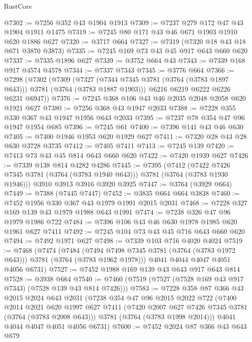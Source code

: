 \begin{lexlean}{RustCore}
\begin{coremodule}
@7302 := @7256 @352 @43 @1904 @1913
@7309 := @7237 @279 @172 @47 @43 @1904 @1911 @1475
@7319 := @7245 @80 @171 @43 @46 @671 @1903 @1910 @620 @1886 @627
@7320 := @3717 @664
@7327 := @7319 (@7320 @18 @43 @18 @671 @3870 @3873)
@7335 := @7245 @169 @73 @43 @45 @917 @643 @660 @620
@7337 := @7335 @1896 @627
@7339 := @3752 @664 @43
@7343 := @7339 @168 @917 @4574 @4578
@7344 := @7337 @7343
@7345 := @3776 @664
@7366 := @7298
    (@7302
      (@7309
        (@7327 (@7344 @7345 @3781 (@3764 (@3783 @1897 @643))) @3781 (@3764 (@3783 @1887 @1903)))
        @6216
        @6219
        @6222
        @6226
        @6231
        @6947))
@7376 := @7245 @368 @106 @43 @46 @2035 @2048 @2058 @620 @1921 @627
@7380 := @7256 @368 @43 @1947 @2033
@7388 := @7228 @355 @330 @367 @43 @1947 @1956 @643 @2033
@7395 := @7237 @78 @354 @47 @96 @1947 @1954 @685
@7396 := @7245 @61
@7400 := @7396 @141 @43 @46 @630
@7405 := @7400 @1946 @1953 @620 @1929 @627
@7411 := @7320 @28 @43 @28 @630 @3728 @3735
@7412 := @7405 @7411
@7413 := @7245 @139
@7420 := @7413 @73 @43 @45 @814 @643 @660 @620
@7422 := @7420 @1939 @627
@7426 := @7339 @138 @814 @4282 @4286
@7445 := @7395
    (@7412 (@7422 @7426 @7345 @3781 (@3764 (@3783 @1940 @643))) @3781 (@3764 (@3783 @1930 @1946)))
    @3910
    @3913
    @3916
    @3920
    @3925
@7447 := @3764 (@3929 @664)
@7449 := @7388 (@7445 @7447)
@7452 := @3835 @664 @664 @3838
@7460 := @7452 @1956 @330 @367 @43 @1979 @1991 @2015 @2031
@7468 := @7228 @327 @169 @139 @43 @1979 @1988 @643 @1991
@7474 := @7238 @326 @47 @96 @1979 @1986 @722
@7484 := @7396 @106 @43 @46 @630 @1978 @1985 @620 @1961 @627 @7411
@7492 := @7245 @104 @73 @43 @45 @716 @643 @660 @620
@7494 := @7492 @1971 @627
@7498 := @7339 @103 @716 @4020 @4024
@7519 := @7468
    (@7474
      (@7484 (@7494 @7498 @7345 @3781 (@3764 (@3783 @1972 @643))) @3781 (@3764 (@3783 @1962 @1978)))
      @4041
      @4044
      @4047
      @4051
      @4056
      @6731)
@7527 := @7452 @1988 @169 @139 @43 @643 @917 @643 @814
@7528 := @3938 @664
@7540 := @7460 (@7519 (@7527 (@7528 @169 @43 @917 @7343) (@7528 @139 @43 @814 @7426)))
@7583 := @7228
    @358
    @87
    @366
    @43
    @2015
    @2024
    @643
    @2031
    (@7238
      @354
      @47
      @96
      @2015
      @2022
      @722
      (@7400
        @2014
        @2021
        @620
        @1997
        @627
        @7411
        (@7420 @2007 @627 @7426 @7345 @3781 (@3764 (@3783 @2008 @643)))
        @3781
        (@3764 (@3783 @1998 @2014)))
      @4041
      @4044
      @4047
      @4051
      @4056
      @6731)
@7600 := @7452
    @2024
    @87
    @366
    @43
    @643
    @679

\end{coremodule}
\end{lexlean}
